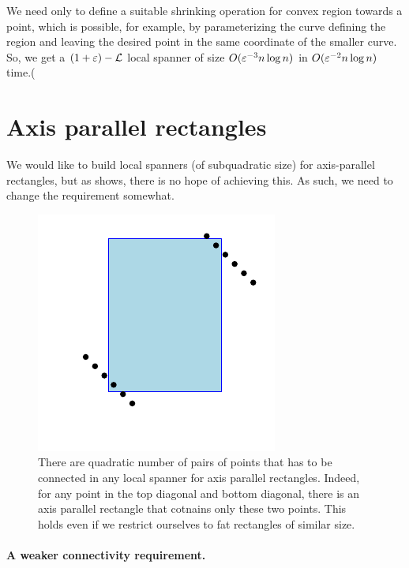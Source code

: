 \documentclass[12pt]{article}%
\begin{document}
We need only to define a suitable shrinking operation for convex
region towards a point, which is possible, for example, by
parameterizing the curve defining the region and leaving the desired
point in the same coordinate of the smaller curve. So, we get a
$(1+\varepsilon)-\mathcal{L}$ local spanner of size $O(\varepsilon^{-3}n\log n)$ in
$O(\varepsilon^{-2}n\log n)$ time.(



\section{Axis parallel rectangles}

We would like to build local spanners (of subquadratic size) for
axis-parallel rectangles, but as  shows, there
is no hope of achieving this. As such, we need to change the
requirement somewhat.

\begin{figure}
    \centerline{\includegraphics{figs/local_rectangles}}
    \caption{There are quadratic number of pairs of points that has to
       be connected in any local spanner for axis parallel
       rectangles. Indeed, for any point in the top diagonal and
       bottom diagonal, there is an axis parallel rectangle that
       cotnains only these two points. This holds even if we restrict
       ourselves to fat rectangles of similar size.}
\end{figure}

\newcommand{\rect}{\Mh{R}}%

\paragraph{A weaker connectivity requirement.}
\end{document}
